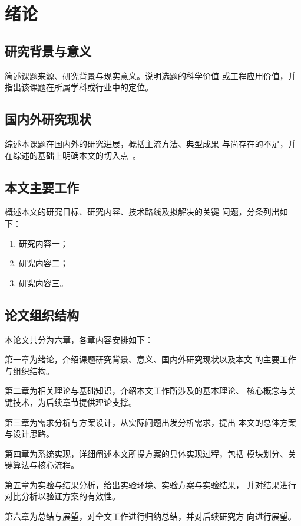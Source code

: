 %

\chapter{绪论}
\label{chap:intro}

\section{研究背景与意义}
简述课题来源、研究背景与现实意义。说明选题的科学价值
或工程应用价值，并指出该课题在所属学科或行业中的定位。

\section{国内外研究现状}
综述本课题在国内外的研究进展，概括主流方法、典型成果
与尚存在的不足，并在综述的基础上明确本文的切入点~\cite{example1}。

\section{本文主要工作}
概述本文的研究目标、研究内容、技术路线及拟解决的关键
问题，分条列出如下：
\begin{enumerate}
\item 研究内容一；
\item 研究内容二；
\item 研究内容三。
\end{enumerate}

\section{论文组织结构}
本论文共分为六章，各章内容安排如下：

第一章为绪论，介绍课题研究背景、意义、国内外研究现状以及本文
的主要工作与组织结构。

第二章为相关理论与基础知识，介绍本文工作所涉及的基本理论、
核心概念与关键技术，为后续章节提供理论支撑。

第三章为需求分析与方案设计，从实际问题出发分析需求，提出
本文的总体方案与设计思路。

第四章为系统实现，详细阐述本文所提方案的具体实现过程，包括
模块划分、关键算法与核心流程。

第五章为实验与结果分析，给出实验环境、实验方案与实验结果，
并对结果进行对比分析以验证方案的有效性。

第六章为总结与展望，对全文工作进行归纳总结，并对后续研究方
向进行展望。
